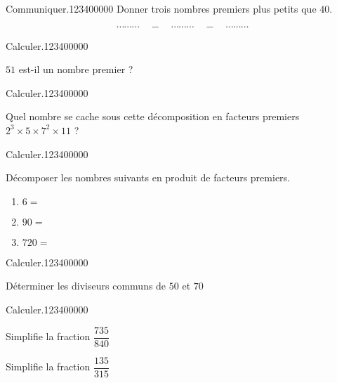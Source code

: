 \begin{pageAD} 
 

\begin{ExoCad}{Communiquer.}{1234}{0}{0}{0}{0}{0}
Donner trois nombres premiers plus petits que $40$. 

$$  \cdots\cdots\cdots  \quad-\quad \cdots\cdots\cdots \quad-\quad  \cdots\cdots\cdots $$
\end{ExoCad}


\begin{ExoCad}{Calculer.}{1234}{0}{0}{0}{0}{0}

$51$ est-il un nombre premier ?  
\end{ExoCad}


\begin{ExoCad}{Calculer.}{1234}{0}{0}{0}{0}{0}

Quel nombre se cache sous cette décomposition en facteurs premiers $2^3 \times 5 \times 7^2  \times 11$ ?  


\end{ExoCad}


\begin{ExoCad}{Calculer.}{1234}{0}{0}{0}{0}{0}

Décomposer les nombres suivants en produit de facteurs premiers.
\begin{enumerate}[leftmargin=*]
\item $6 =$  
\item $90 =$  
\item $720 =$  
\end{enumerate}
\end{ExoCad}



 


\begin{ExoCad}{Calculer.}{1234}{0}{0}{0}{0}{0}

Déterminer les diviseurs communs de $50$ et $70$ 


\end{ExoCad}




\begin{ExoCad}{Calculer.}{1234}{0}{0}{0}{0}{0}

\begin{minipage}{0.48\linewidth}
Simplifie la fraction $\dfrac{735}{840}$ 

\end{minipage}
\hfill
\begin{minipage}{0.48\linewidth}
Simplifie la fraction $\dfrac{135}{315}$ 

\end{minipage}


\end{ExoCad}


 
\end{pageAD}


